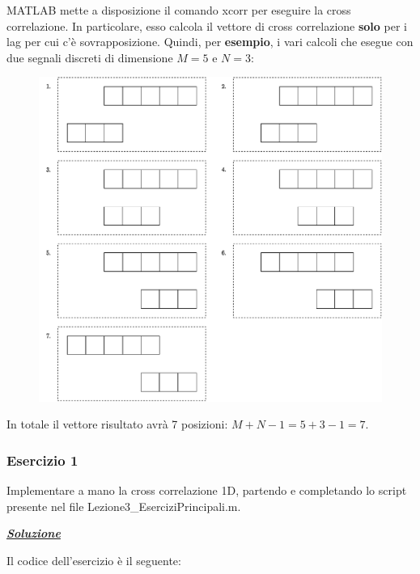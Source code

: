 \documentclass[a4paper]{article}
\begin{document}
	MATLAB mette a disposizione il comando \textsf{xcorr} per eseguire la cross correlazione. In particolare, esso calcola il vettore di cross correlazione \textbf{solo} per i lag per cui c'è sovrapposizione. Quindi, per \textcolor{Green4}{\textbf{esempio}}, i vari calcoli che esegue con due segnali discreti di dimensione $M=5$ e $N=3$:
	\begin{figure}[!htp]
		\centering
		\includegraphics[width=\textwidth]{img/lab/cross-correlazione-6.pdf}
	\end{figure}
	
	\noindent
	In totale il vettore risultato avrà 7 posizioni: $M + N - 1 = 5 + 3 - 1 = 7$.\newpage
	
	\subsubsection{Esercizio 1}
	
	Implementare a mano la cross correlazione 1D, partendo e completando lo script presente nel file \textsf{Lezione3\_EserciziPrincipali.m}.\newline
	
	\noindent
	\textcolor{Green4}{\textbf{\emph{\underline{Soluzione}}}}\newline
	
	\noindent
	Il codice dell'esercizio è il seguente:
	
	
\end{document}
